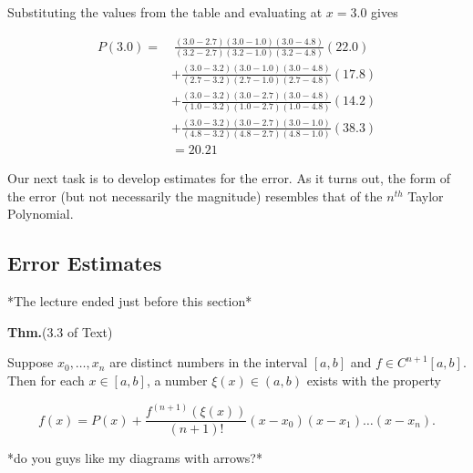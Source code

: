 \documentclass[12pt]{article}
\newcommand{\thm}{\textbf{Thm.}\xspace}
\begin{document}
Substituting the values from the table and evaluating at $x=3.0$ gives 

\begin{align*}
    P(3.0) = &\ \frac{(3.0 - 2.7)(3.0 - 1.0)(3.0 - 4.8)}{(3.2 - 2.7)(3.2 - 1.0)(3.2 - 4.8)} (22.0) \\
    &+ \frac{(3.0 - 3.2)(3.0 - 1.0)(3.0 - 4.8)}{(2.7 - 3.2)(2.7 - 1.0)(2.7 - 4.8)} (17.8) \\
    &+ \frac{(3.0 - 3.2)(3.0 - 2.7)(3.0 - 4.8)}{(1.0 - 3.2)(1.0 - 2.7)(1.0 - 4.8)} (14.2) \\
    &+ \frac{(3.0 - 3.2)(3.0 - 2.7)(3.0 - 1.0)}{(4.8 - 3.2)(4.8 - 2.7)(4.8 - 1.0)} (38.3) \\
    &= 20.21
\end{align*}

Our next task is to develop estimates for the error. As it turns out, the form
of the error (but not necessarily the magnitude) resembles that of the $n^{th}$
Taylor Polynomial.

\subsection{Error Estimates}

*The lecture ended just before this section*

\thm (3.3 of Text)

Suppose $x_0, \dots, x_n$ are distinct numbers in the interval $[a,b]$ and
$f\in C^{n+1}[a,b]$. Then for each $x\in [a,b]$, a number $\xi(x)\in(a,b)$
exists with the property

\[
  f(x) = P(x) + \frac{f^{(n+1)}(\xi(x))}{(n+1)!} (x-x_0) (x-x_1) \dots (x-x_n)
.\]

\begin{center}
\end{center}

*do you guys like my diagrams with arrows?*
\end{document}
